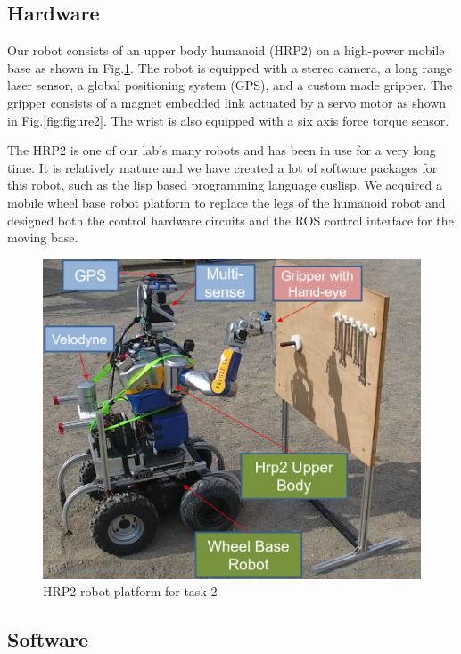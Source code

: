 \documentclass{standalone}
\begin{document}
\subsection{Hardware}
Our robot consists of an upper body humanoid (HRP2) on a high-power mobile base as shown in Fig.\ref{fig:figure1}. The robot is equipped with a stereo camera, a long range laser sensor, a global positioning system (GPS), and a custom made gripper. The gripper consists of a magnet embedded link actuated by a servo motor as shown in Fig.\ref{fig:figure2}. The wrist is also equipped with a six axis force torque sensor.

The HRP2 is one of our lab's many robots and has been in use for a very long time. It is relatively mature and we have created a lot of software packages for this robot, such as the lisp based programming language euslisp. %
We acquired a mobile wheel base robot platform to replace the legs of the humanoid robot and designed both the control hardware circuits and the ROS control interface for the moving base.


\begin{figure}[t]
  \includegraphics[width=\columnwidth]{sections/task2/images/hrp2.png}
  \caption{HRP2 robot platform for task 2}
  \label{fig:figure1}
\end{figure}

\subsection{Software}
\end{document}
